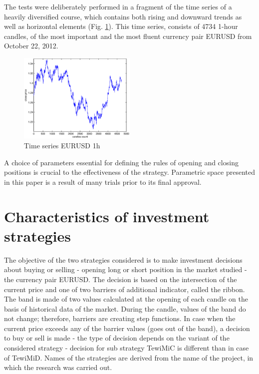 \documentclass{tewiart}
\begin{document}
The tests were deliberately performed in a fragment of the time series of a heavily diversified course, which contains both rising and downward trends as well as horizontal elements (Fig. \ref{timeSeries}). This time series, consists of 4734  \mbox{1-hour } candles, of the most important and the most fluent currency pair EURUSD from October 22, 2012.
\begin{figure}[h!]
\begin{center}
\includegraphics[width = 0.5\textwidth]{pictures/eurusd221012.eps}
\end{center}
\caption{Time series EURUSD 1h}
\label{timeSeries}
\end{figure}
\FloatBarrier
A choice of parameters essential for defining the rules of opening and closing positions is crucial to the effectiveness of the strategy. Parametric space presented in this paper is a result of many trials prior to its final approval.
\section{Characteristics of investment strategies}
The objective of the two strategies considered is to make investment decisions about buying or selling - opening long or short position in the market studied - the currency pair EURUSD.  The decision is based on the intersection of the current price and one of two barriers of additional indicator, called the ribbon. The band is made of two values calculated at the opening of each candle on the basis of historical data of the market. During the candle, values of the band do not change; therefore, barriers are creating step functions. In case when the current price exceeds any of the barrier values (goes out of the band), a decision to buy or sell is made - the type of decision depends on the variant of the considered strategy - decision for sub strategy TewiMiC is different than in case of TewiMiD. Names of the strategies are derived from the name of the project, in which the research was carried out.
\end{document}
